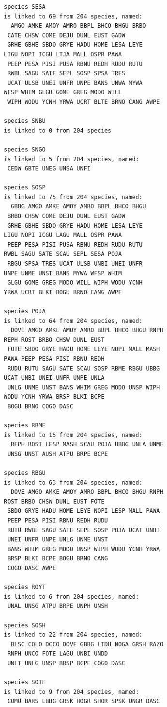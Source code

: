 \documentclass{statsoc}
\begin{document}
\begin{lstlisting}
species SESA
is linked to 69 from 204 species, named:
  AMGO AMKE AMOY AMRO BBPL BHCO BHGU BRBO
 CATE CHSW COME DEJU DUNL EUST GADW
 GRHE GBHE SBDO GRYE HADU HOME LESA LEYE 
LIGU NOPI ICGU LTJA MALL OSPR PAWA
 PEEP PESA PISI PUSA RBNU REDH RUDU RUTU
 RWBL SAGU SATE SEPL SOSP SPSA TRES
 UCAT ULSB UNEI UNFR UNPE BANS UNWA MYWA 
WFSP WHIM GLGU GOME GREG MODO WILL
 WIPH WODU YCNH YRWA UCRT BLTE BRNO CANG AWPE

species SNBU
is linked to 0 from 204 species

species SNGO
is linked to 5 from 204 species, named:
 CEDW GBTE UNEG UNSA UNFI

species SOSP
is linked to 75 from 204 species, named:
  GBBG AMGO AMKE AMOY AMRO BBPL BHCO BHGU
 BRBO CHSW COME DEJU DUNL EUST GADW
 GRHE GBHE SBDO GRYE HADU HOME LESA LEYE 
LIGU NOPI ICGU LAGU MALL OSPR PAWA
 PEEP PESA PISI PUSA RBNU REDH RUDU RUTU 
RWBL SAGU SATE SCAU SEPL SESA POJA
 RBGU SPSA TRES UCAT ULSB UNBI UNEI UNFR 
UNPE UNME UNST BANS MYWA WFSP WHIM
 GLGU GOME GREG MODO WILL WIPH WODU YCNH 
YRWA UCRT BLKI BOGU BRNO CANG AWPE

species POJA
is linked to 64 from 204 species, named:
  DOVE AMGO AMKE AMOY AMRO BBPL BHCO BHGU RNPH 
REPH ROST BRBO CHSW DUNL EUST
 FOTE SBDO GRYE HADU HOME LEYE NOPI MALL MASH 
PAWA PEEP PESA PISI RBNU REDH
 RUDU RUTU SAGU SATE SCAU SOSP RBME RBGU UBBG 
UCAT UNBI UNEI UNFR UNPE UNLA
 UNLG UNME UNST BANS WHIM GREG MODO UNSP WIPH 
WODU YCNH YRWA BRSP BLKI BCPE
 BOGU BRNO COGO DASC

species RBME
is linked to 15 from 204 species, named:
  REPH ROST LESP MASH SCAU POJA UBBG UNLA UNME
 UNSG UNST AUSH ATPU BRPE BCPE

species RBGU
is linked to 63 from 204 species, named:
  DOVE AMGO AMKE AMOY AMRO BBPL BHCO BHGU RNPH 
ROST BRBO CHSW DUNL EUST FOTE
 SBDO GRYE HADU HOME LEYE NOPI LESP MALL PAWA
 PEEP PESA PISI RBNU REDH RUDU
 RUTU RWBL SAGU SATE SEPL SOSP POJA UCAT UNBI
 UNEI UNFR UNPE UNLG UNME UNST
 BANS WHIM GREG MODO UNSP WIPH WODU YCNH YRWA
 BRSP BLKI BCPE BOGU BRNO CANG
 COGO DASC AWPE

species ROYT
is linked to 6 from 204 species, named:
 UNAL UNSG ATPU BRPE UNPH UNSH

species SOSH
is linked to 22 from 204 species, named:
  BLSC COLO DCCO DOVE GBBG LTDU NOGA GRSH RAZO
 RNPH UNCO FOTE LAGU UNBI UNDD
 UNLT UNLG UNSP BRSP BCPE COGO DASC

species SOTE
is linked to 9 from 204 species, named:
 COMU BARS LBBG GRSK HOGR SHOR SPSK UNGR DASC


\end{lstlisting}
\end{document}
